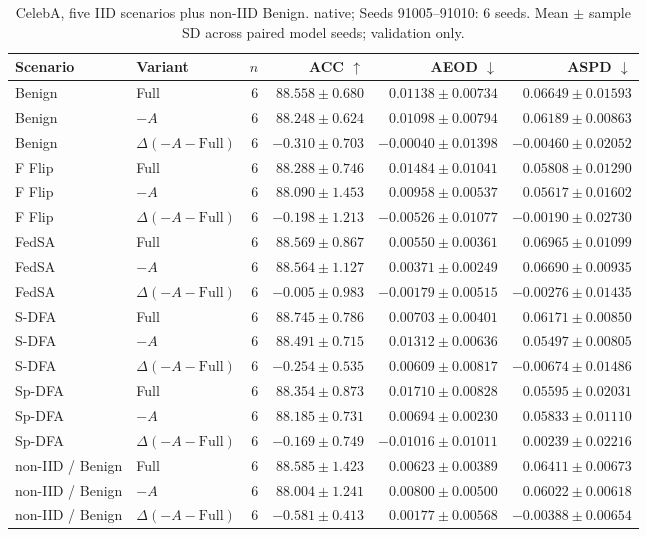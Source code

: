 \begin{table}[t]
\centering
\small
\caption{CelebA, five IID scenarios plus non-IID Benign. native; Seeds 91005–91010: 6 seeds. Mean $\pm$ sample SD across paired model seeds; validation only.}
\begin{tabular}{llrrrr}
\toprule
Scenario & Variant & $n$ & ACC $\uparrow$ & AEOD $\downarrow$ & ASPD $\downarrow$ \\
\midrule
Benign & Full & 6 & $88.558 \pm 0.680$ & $0.01138 \pm 0.00734$ & $0.06649 \pm 0.01593$ \\
Benign & $-A$ & 6 & $88.248 \pm 0.624$ & $0.01098 \pm 0.00794$ & $0.06189 \pm 0.00863$ \\
Benign & $\Delta(-A-\mathrm{Full})$ & 6 & $-0.310 \pm 0.703$ & $-0.00040 \pm 0.01398$ & $-0.00460 \pm 0.02052$ \\
F Flip & Full & 6 & $88.288 \pm 0.746$ & $0.01484 \pm 0.01041$ & $0.05808 \pm 0.01290$ \\
F Flip & $-A$ & 6 & $88.090 \pm 1.453$ & $0.00958 \pm 0.00537$ & $0.05617 \pm 0.01602$ \\
F Flip & $\Delta(-A-\mathrm{Full})$ & 6 & $-0.198 \pm 1.213$ & $-0.00526 \pm 0.01077$ & $-0.00190 \pm 0.02730$ \\
FedSA & Full & 6 & $88.569 \pm 0.867$ & $0.00550 \pm 0.00361$ & $0.06965 \pm 0.01099$ \\
FedSA & $-A$ & 6 & $88.564 \pm 1.127$ & $0.00371 \pm 0.00249$ & $0.06690 \pm 0.00935$ \\
FedSA & $\Delta(-A-\mathrm{Full})$ & 6 & $-0.005 \pm 0.983$ & $-0.00179 \pm 0.00515$ & $-0.00276 \pm 0.01435$ \\
S-DFA & Full & 6 & $88.745 \pm 0.786$ & $0.00703 \pm 0.00401$ & $0.06171 \pm 0.00850$ \\
S-DFA & $-A$ & 6 & $88.491 \pm 0.715$ & $0.01312 \pm 0.00636$ & $0.05497 \pm 0.00805$ \\
S-DFA & $\Delta(-A-\mathrm{Full})$ & 6 & $-0.254 \pm 0.535$ & $0.00609 \pm 0.00817$ & $-0.00674 \pm 0.01486$ \\
Sp-DFA & Full & 6 & $88.354 \pm 0.873$ & $0.01710 \pm 0.00828$ & $0.05595 \pm 0.02031$ \\
Sp-DFA & $-A$ & 6 & $88.185 \pm 0.731$ & $0.00694 \pm 0.00230$ & $0.05833 \pm 0.01110$ \\
Sp-DFA & $\Delta(-A-\mathrm{Full})$ & 6 & $-0.169 \pm 0.749$ & $-0.01016 \pm 0.01011$ & $0.00239 \pm 0.02216$ \\
non-IID / Benign & Full & 6 & $88.585 \pm 1.423$ & $0.00623 \pm 0.00389$ & $0.06411 \pm 0.00673$ \\
non-IID / Benign & $-A$ & 6 & $88.004 \pm 1.241$ & $0.00800 \pm 0.00500$ & $0.06022 \pm 0.00618$ \\
non-IID / Benign & $\Delta(-A-\mathrm{Full})$ & 6 & $-0.581 \pm 0.413$ & $0.00177 \pm 0.00568$ & $-0.00388 \pm 0.00654$ \\
\bottomrule
\end{tabular}
\end{table}

